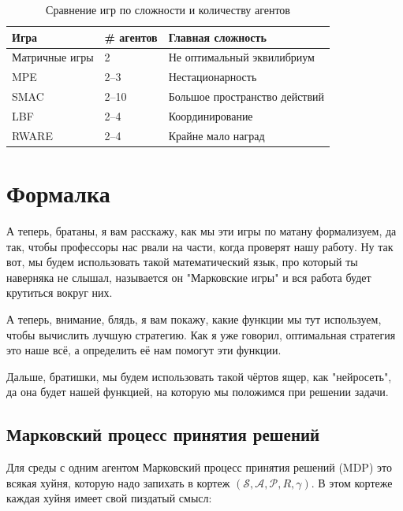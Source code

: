 \begin{table}[H]
	\centering
	\caption{Сравнение игр по сложности и количеству агентов}
	\label{tab:games2}
	\begin{tabular}{@{}|l|l|l|@{}}
		\toprule
		Игра           & \# агентов & Главная сложность             \\ \midrule
		Матричные игры & 2          & Не оптимальный эквилибриум    \\
		MPE            & 2--3       & Нестационарность              \\
		SMAC           & 2--10      & Большое пространство действий \\
		LBF            & 2--4       & Координирование               \\
		RWARE          & 2--4       & Крайне мало наград            \\ \bottomrule
	\end{tabular}
\end{table}

\section{Формалка}

А теперь, братаны, я вам расскажу, как мы эти игры по матану формализуем, да так, чтобы профессоры нас рвали на части, когда проверят нашу работу. Ну так вот, мы будем использовать такой математический язык, про который ты наверняка не слышал, называется он "Марковские игры" и вся работа будет крутиться вокруг них.

А теперь, внимание, блядь, я вам покажу, какие функции мы тут используем, чтобы вычислить лучшую стратегию. Как я уже говорил, оптимальная стратегия это наше всё, а определить её нам помогут эти функции.

Дальше, братишки, мы будем использовать такой чёртов ящер, как "нейросеть", да она будет нашей функцией, на которую мы положимся при решении задачи.

\subsection{Марковский процесс принятия решений} \label{sec:mdp}

Для среды с одним агентом Марковский процесс принятия решений (MDP) это всякая хуйня, которую надо запихать в кортеж \((\mathcal{S}, \mathcal{A}, \mathcal{P}, R, \gamma )\). В этом кортеже каждая хуйня имеет свой пиздатый смысл:

